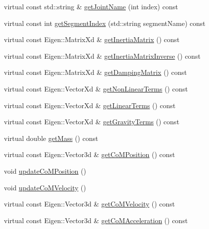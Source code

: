 \begin{DoxyCompactItemize}
\item 
virtual const std\-::string \& \hyperlink{classocra__icub_1_1OcraWbiModel_a83d6bc29496259e0f23cc085e29aa431}{get\-Joint\-Name} (int index) const 
\item 
virtual const int \hyperlink{classocra__icub_1_1OcraWbiModel_a1d0f2eb31988a8c91b11a3343392fcf9}{get\-Segment\-Index} (std\-::string segment\-Name) const 
\item 
virtual const \-Eigen\-::\-Matrix\-Xd \& \hyperlink{classocra__icub_1_1OcraWbiModel_a49df5e4d811b660c72b35b6d822bb529}{get\-Inertia\-Matrix} () const 
\item 
virtual const \-Eigen\-::\-Matrix\-Xd \& \hyperlink{classocra__icub_1_1OcraWbiModel_a2dfc6cc2f527cc3aec668607b36e5fe9}{get\-Inertia\-Matrix\-Inverse} () const 
\item 
virtual const \-Eigen\-::\-Matrix\-Xd \& \hyperlink{classocra__icub_1_1OcraWbiModel_ae8bc8fbe99ae23b45a40ec867ca066f9}{get\-Damping\-Matrix} () const 
\item 
virtual const \-Eigen\-::\-Vector\-Xd \& \hyperlink{classocra__icub_1_1OcraWbiModel_a8cf1d870edf8c069cb1b196e0cab1f67}{get\-Non\-Linear\-Terms} () const 
\item 
virtual const \-Eigen\-::\-Vector\-Xd \& \hyperlink{classocra__icub_1_1OcraWbiModel_aa85e588223e6c40dabb740089b2cf3ea}{get\-Linear\-Terms} () const 
\item 
virtual const \-Eigen\-::\-Vector\-Xd \& \hyperlink{classocra__icub_1_1OcraWbiModel_a57742157dce7e3526a388be7d11321d3}{get\-Gravity\-Terms} () const 
\item 
virtual double \hyperlink{classocra__icub_1_1OcraWbiModel_a7f52d830940df32916f46b905d985505}{get\-Mass} () const 
\item 
virtual const \-Eigen\-::\-Vector3d \& \hyperlink{classocra__icub_1_1OcraWbiModel_a3af6973d940c01a80085d65841bb27a8}{get\-Co\-M\-Position} () const 
\item 
void \hyperlink{classocra__icub_1_1OcraWbiModel_afe1b4f03c2163bd1fcf7be5f9b59f319}{update\-Co\-M\-Position} ()
\item 
void \hyperlink{classocra__icub_1_1OcraWbiModel_a67ac0007da800a0f096fbd4e4908ecb8}{update\-Co\-M\-Velocity} ()
\item 
virtual const \-Eigen\-::\-Vector3d \& \hyperlink{classocra__icub_1_1OcraWbiModel_af7f16945aafd4881f1cfd94498a78ebf}{get\-Co\-M\-Velocity} () const 
\item 
virtual const \-Eigen\-::\-Vector3d \& \hyperlink{classocra__icub_1_1OcraWbiModel_a7e5f552f463bf58b1c9828575c78ee90}{get\-Co\-M\-Acceleration} () const 

\end{DoxyCompactItemize}
